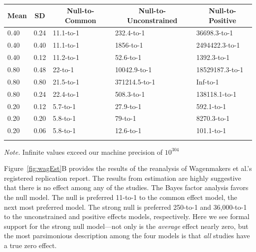 \documentclass[english,man]{apa6}
\theoremstyle{definition}
\theoremstyle{definition}
\theoremstyle{remark}
\begin{document}
\begin{table}[tbp]
\begin{center}
\begin{threeparttable}
\caption{\label{tab:sens}}
\begin{tabular}{lllll}
\toprule
Mean & \multicolumn{1}{c}{SD} & \multicolumn{1}{c}{Null-to-Common} & \multicolumn{1}{c}{Null-to-Unconstrained} & \multicolumn{1}{c}{Null-to-Positive}\\
\midrule
0.40 & 0.24 & 11.1-to-1 & 232.4-to-1 & 36698.3-to-1\\
0.40 & 0.40 & 11.1-to-1 & 1856-to-1 & 2494422.3-to-1\\
0.40 & 0.12 & 11.2-to-1 & 52.6-to-1 & 1392.3-to-1\\
0.80 & 0.48 & 22-to-1 & 10042.9-to-1 & 18529187.3-to-1\\
0.80 & 0.80 & 21.5-to-1 & 371214.5-to-1 & Inf-to-1\\
0.80 & 0.24 & 22.4-to-1 & 508.3-to-1 & 138118.1-to-1\\
0.20 & 0.12 & 5.7-to-1 & 27.9-to-1 & 592.1-to-1\\
0.20 & 0.20 & 5.8-to-1 & 79-to-1 & 8270.3-to-1\\
0.20 & 0.06 & 5.8-to-1 & 12.6-to-1 & 101.1-to-1\\
\bottomrule
\addlinespace
\end{tabular}
\begin{tablenotes}[para]
\textit{Note.} Infinite values exceed our machine precision of $10^304$
\end{tablenotes}
\end{threeparttable}
\end{center}
\end{table}

Figure~\ref{fig:wagEst}B provides the results of the reanalysis of
Wagenmakers et al.'s registered replication report. The results from
estimation are highly suggestive that there is no effect among any of
the studies. The Bayes factor analysis favors the null model. The null
is preferred 11-to-1 to the common effect model, the next most preferred
model. The strong null is preferred 250-to-1 and 36,000-to-1 to the
unconstrained and positive effects models, respectively. Here we see
formal support for the strong null model---not only is the
\emph{average} effect nearly zero, but the most parsimonious description
among the four models is that \emph{all} studies have a true zero
effect.
\end{document}
